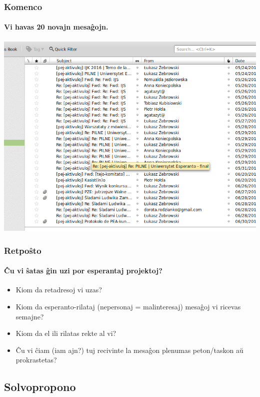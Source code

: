   \begin{frame}
    \frametitle{Komenco}
    \framesubtitle{Vi havas 20 novajn mesaĝojn.}
    
  \begin{center}
    	\includegraphics[scale=0.3]{ekranoj/retposhto}
	\end{center}
  \end{frame}
 

  \begin{frame}
    \frametitle{Retpoŝto}
    \framesubtitle{Ĉu vi ŝatas ĝin uzi por esperantaj projektoj?}
    \begin{itemize}
    	\item Kiom da retadresoj vi uzas?
    	\item Kiom da esperanto-rilataj (nepersonaj = malinteresaj) mesaĝoj vi ricevas semajne?
    	\item Kiom da el ili rilatas rekte al vi?
    	\item Ĉu vi ĉiam (iam ajn?) tuj recivinte la mesaĝon plenumas peton/taskon aŭ prokrastetas?
    \end{itemize}
  \end{frame}
   
   
\subsection{Solvopropono}
   
